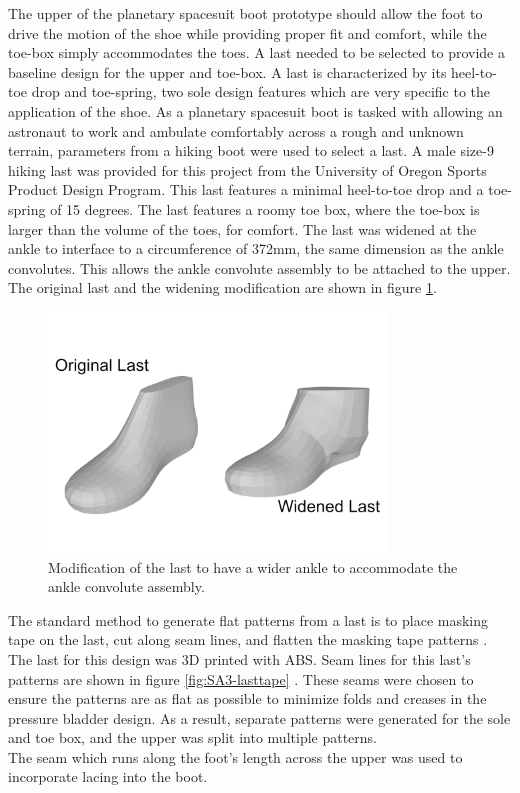 \documentclass[defaultstyle,11pt]{thesis}
\begin{document}
The upper of the planetary spacesuit boot prototype should allow the foot to drive the motion of the shoe while providing proper fit and comfort, while the toe-box simply accommodates the toes.
A last needed to be selected to provide a baseline design for the upper and toe-box.
A last is characterized by its heel-to-toe drop and toe-spring, two sole design features which are very specific to the application of the shoe.
As a planetary spacesuit boot is tasked with allowing an astronaut to work and ambulate comfortably across a rough and unknown terrain, parameters from a hiking boot were used to select a last.
A male size-9 hiking last was provided for this project from the University of Oregon Sports Product Design Program.
This last features a minimal heel-to-toe drop and a toe-spring of 15 degrees.
The last features a roomy toe box, where the toe-box is larger than the volume of the toes, for comfort.
The last was widened at the ankle to interface to a circumference of 372mm, the same dimension as the ankle convolutes.
This allows the ankle convolute assembly to be attached to the upper.
The original last and the widening modification are shown in figure \ref{fig:SA3-lastmod}.

\begin{figure}
\hypertarget{fig:SA3-lastmod}{%
\centering
\includegraphics[width=0.8\textwidth,height=\textheight]{../fig/SA3/LastModification.png}
\caption{Modification of the last to have a wider ankle to accommodate the ankle convolute assembly.}\label{fig:SA3-lastmod}
}
\end{figure}

The standard method to generate flat patterns from a last is to place masking tape on the last, cut along seam lines, and flatten the masking tape patterns \citep{Motawi2020}.
The last for this design was 3D printed with ABS.
Seam lines for this last's patterns are shown in figure \ref{fig:SA3-lasttape} .
These seams were chosen to ensure the patterns are as flat as possible to minimize folds and creases in the pressure bladder design.
As a result, separate patterns were generated for the sole and toe box, and the upper was split into multiple patterns.\\
The seam which runs along the foot's length across the upper was used to incorporate lacing into the boot.
\end{document}
